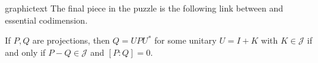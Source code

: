 \documentclass{article}
\begin{document}
\begin{staticcontents*}{graphictext}
  The final piece in the puzzle is the following link between  and essential codimension.

  \begin{proposition}
    If $P,Q$ are projections, then $Q = UPU^{*}$ for some unitary $U = I+K$ with $K \in \mathcal{J}$ if and only if $P-Q \in \mathcal{J}$ and $[P:Q] = 0$.
  \end{proposition}

\end{staticcontents*}



\end{document}
